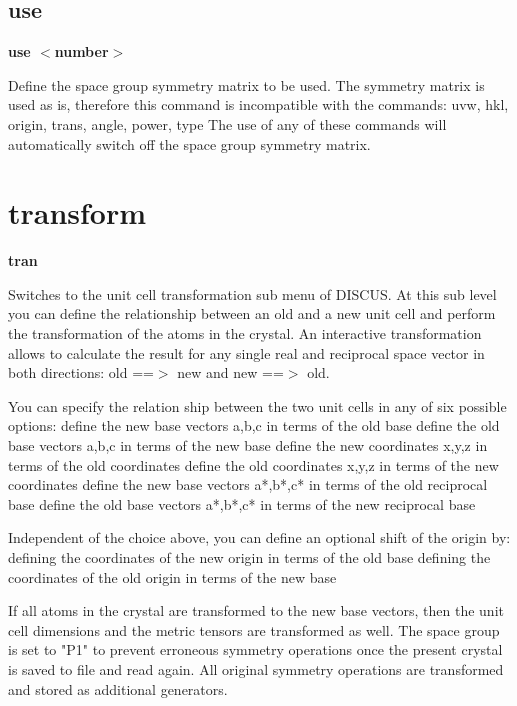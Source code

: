 \subsection*{use}
{\bf use $ <$number$> $ \par }
\par
\vspace{3pt}
Define the space group symmetry matrix to be used. 
The symmetry matrix is used as is, therefore this command is 
incompatible with the commands: 
   uvw, hkl, origin, trans, angle, power, type 
The use of any of these commands will automatically switch off the 
space group symmetry matrix. 
\section{transform}
{\bf tran \par }
\par
\vspace{3pt}
Switches to the unit cell transformation sub menu of DISCUS. 
At this sub level you can define the relationship between an old and a 
new unit cell and perform the transformation of the atoms in the crystal. 
An interactive transformation allows to calculate the result for any 
single real and reciprocal space vector in both directions: 
old ==$> $ new and new ==$> $ old. 
\par
You can specify the relation ship between the two unit cells in any of 
six possible options: 
define the new base vectors a,b,c in terms of the old base 
define the old base vectors a,b,c in terms of the new base 
define the new coordinates x,y,z in terms of the old coordinates 
define the old coordinates x,y,z in terms of the new coordinates 
define the new base vectors a*,b*,c* in terms of the old reciprocal base 
define the old base vectors a*,b*,c* in terms of the new reciprocal base 
\par
Independent of the choice above, you can define an optional shift of the 
origin by: 
defining the coordinates of the new origin in terms of the old base 
defining the coordinates of the old origin in terms of the new base 
\par
If all atoms in the crystal are transformed to the new base vectors, then 
the unit cell dimensions and the metric tensors are transformed as well. 
The space group is set to "P1" to prevent erroneous symmetry operations 
once the present crystal is saved to file and read again. All original 
symmetry operations are transformed and stored as additional generators. 
\par
